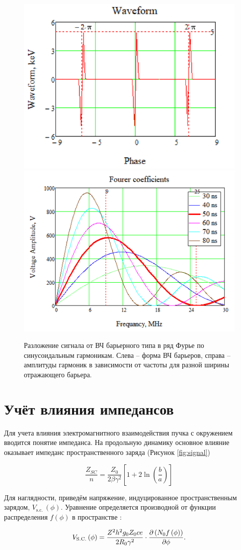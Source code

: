 \documentclass[a4paper,
               keeplastbox,   %
               ]{jacow}
\begin{document}
\begin{figure}[!htb]
   \includegraphics*[width=.49\columnwidth]{img/fig_05-1}
   \includegraphics*[width=.49\columnwidth]{img/fig_05-2}
   \caption{Разложение сигнала от ВЧ барьерного типа в ряд Фурье по синусоидальным гармоникам. Слева – форма 
   ВЧ барьеров, справа – амплитуды гармоник в зависимости от частоты для разной ширины отражающего барьера.}
   \label{fig:wave}
\end{figure}

\section{Учёт влияния импедансов}

\par Для учета влияния электромагнитного взаимодействия пучка с окружением вводится понятие импеданса. На продольную динамику основное влияние оказывает импеданс пространственного заряда (Рисунок \ref{fig:signal}) 

\begin{equation}
\frac{Z_{SC}}{n}=\frac{Z_0}{2\beta\gamma^2}\left[1+2\ln{\left(\frac{b}{a}\right)}\right]
\label{sc}
\end{equation}

Для наглядности, приведём напряжение, индуцированное пространственным зарядом, $V_{\mathrm{s.c.\ }}(\phi)$. Уравнение определяется производной от функции распределения $f(\phi)$ в пространстве \cite{Lee_SC}:

\begin{equation}
V_{\rm{S.C.}}\left(\phi\right)=\frac{Z^2h^2g_0Z_0ce}{2R_0\gamma^2}\cdot\frac{\partial\left(N_0f\left(\phi\right)\right)}{\partial\phi}.
\label{V_sc}
\end{equation}
\end{document}
